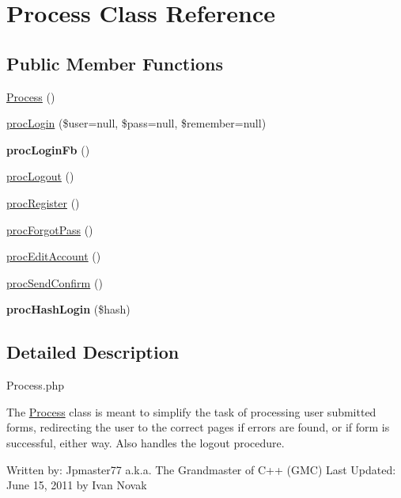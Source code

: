 \hypertarget{class_process}{\section{Process Class Reference}
\label{class_process}
}
\subsection*{Public Member Functions}
\begin{DoxyCompactItemize}
\item 
\hyperlink{class_process_ad7463a1ff9396bfdf6f11cf8dce44ded}{Process} ()
\item 
\hyperlink{class_process_af8ad635cb32feec7dcf8fdefe9d67522}{proc\-Login} (\$user=null, \$pass=null, \$remember=null)
\item 
\hypertarget{class_process_a9bf01d584caadb8b412c8b7128b6bce8}{{\bfseries proc\-Login\-Fb} ()}\label{class_process_a9bf01d584caadb8b412c8b7128b6bce8}

\item 
\hyperlink{class_process_a467c1d15e6cb47060d4bcc912323d6cd}{proc\-Logout} ()
\item 
\hyperlink{class_process_a2cb0b7d799df56ee15a45684b1fd2623}{proc\-Register} ()
\item 
\hyperlink{class_process_a87a3f17ae4a46b17c382af3a2b941d21}{proc\-Forgot\-Pass} ()
\item 
\hyperlink{class_process_af9535bd1808749999db55aa9fe1d625f}{proc\-Edit\-Account} ()
\item 
\hyperlink{class_process_a352ebfbee83dedb3e1b65c1c50509c6b}{proc\-Send\-Confirm} ()
\item 
\hypertarget{class_process_a97783e91b1b1fce68870006b5366b6fa}{{\bfseries proc\-Hash\-Login} (\$hash)}\label{class_process_a97783e91b1b1fce68870006b5366b6fa}

\end{DoxyCompactItemize}


\subsection{Detailed Description}
Process.\-php

The \hyperlink{class_process}{Process} class is meant to simplify the task of processing user submitted forms, redirecting the user to the correct pages if errors are found, or if form is successful, either way. Also handles the logout procedure.

Written by\-: Jpmaster77 a.\-k.\-a. The Grandmaster of C++ (G\-M\-C) Last Updated\-: June 15, 2011 by Ivan Novak 

